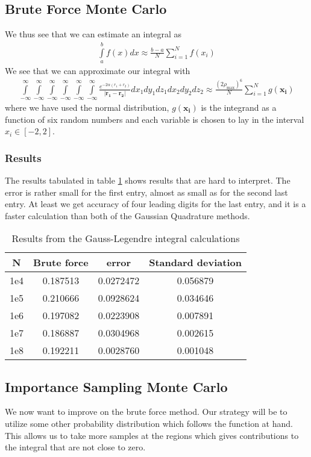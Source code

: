 \documentclass[11pt, a4paper]{article}
\begin{document}
\subsection{Brute Force Monte Carlo}
We thus see that we can estimate an integral as
\begin{gather}
\int\limits_a^b f(x)dx \approx \frac{b-a}{N}\sum\limits_{i=1}^Nf(x_i)
\end{gather}
We see that we can approximate our integral with
\begin{gather}
\int\limits_{-\infty}^\infty\int\limits_{-\infty}^\infty\int\limits_{-\infty}^\infty\int\limits_{-\infty}^\infty\int\limits_{-\infty}^\infty\int\limits_{-\infty}^\infty \frac{e^{-2\alpha(r_1+r_2)}}{|\mathbf{r_1}-\mathbf{r_2}|} dx_1dy_1dz_1dx_2dy_2dz_2
 \approx \frac{(2\rho_\text{max})^6}{N}\sum\limits_{i=1}^N g(\mathbf{x_i})
\end{gather}
where we have used the normal distribution, $g(\mathbf{x_i})$ is the integrand as a function of six random numbers and each variable is chosen to lay in the interval $x_i \in[-2,2]$.
\subsubsection*{Results}
The results tabulated in table \ref{tab:brute} shows results that are hard to interpret. The error is rather small for the first entry, almost as small as for the second last entry. At least we get accuracy of four leading digits for the last entry, and it is a faster calculation than both of the Gaussian Quadrature methods.
\begin{table}[!ht]
\centering
\begin{tabular}{c|c|c|c}
N & Brute force & error & Standard deviation\\
\hline
1e4 & 0.187513 & 0.0272472 & 0.056879\\
1e5 & 0.210666 & 0.0928624 & 0.034646\\
1e6 & 0.197082 & 0.0223908 & 0.007891\\
1e7 & 0.186887 & 0.0304968 & 0.002615\\
1e8 & 0.192211 & 0.0028760 & 0.001048
\end{tabular}
\caption{Results from the Gauss-Legendre integral calculations}
\label{tab:brute}
\end{table}
\subsection{Importance Sampling Monte Carlo}
We now want to improve on the brute force method. Our strategy will be to utilize some other probability distribution which follows the function at hand. This allows us to take more samples at the regions which gives contributions to the integral that are not close to zero.
\end{document}
